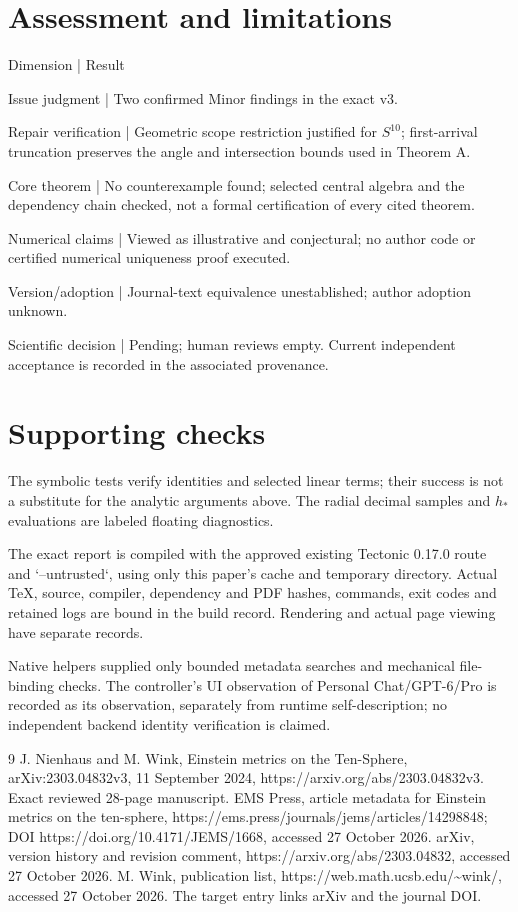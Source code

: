 \documentclass[10pt]{article}
\begin{document}
\section*{Assessment and limitations}
Dimension | Result\par
Issue judgment | Two confirmed Minor findings in the exact v3.\par
Repair verification | Geometric scope restriction justified for \(S^{10}\); first-arrival truncation preserves the angle and intersection bounds used in Theorem A.\par
Core theorem | No counterexample found; selected central algebra and the dependency chain checked, not a formal certification of every cited theorem.\par
Numerical claims | Viewed as illustrative and conjectural; no author code or certified numerical uniqueness proof executed.\par
Version/adoption | Journal-text equivalence unestablished; author adoption unknown.\par
Scientific decision | Pending; human reviews empty. Current independent acceptance is recorded in the associated provenance.\par
\section*{Supporting checks}
The symbolic tests verify identities and selected linear terms; their success is not a substitute for the analytic arguments above. The radial decimal samples and \(h_*\) evaluations are labeled floating diagnostics.\par
The exact report is compiled with the approved existing Tectonic 0.17.0 route and `–untrusted`, using only this paper’s cache and temporary directory. Actual TeX, source, compiler, dependency and PDF hashes, commands, exit codes and retained logs are bound in the build record. Rendering and actual page viewing have separate records.\par
Native helpers supplied only bounded metadata searches and mechanical file-binding checks. The controller’s UI observation of Personal Chat/GPT-6/Pro is recorded as its observation, separately from runtime self-description; no independent backend identity verification is claimed.\par
9 J. Nienhaus and M. Wink, Einstein metrics on the Ten-Sphere, arXiv:2303.04832v3, 11 September 2024, https://arxiv.org/abs/2303.04832v3. Exact reviewed 28-page manuscript. EMS Press, article metadata for Einstein metrics on the ten-sphere, https://ems.press/journals/jems/articles/14298848; DOI https://doi.org/10.4171/JEMS/1668, accessed 27 October 2026. arXiv, version history and revision comment, https://arxiv.org/abs/2303.04832, accessed 27 October 2026. M. Wink, publication list, https://web.math.ucsb.edu/\textasciitilde{}wink/, accessed 27 October 2026. The target entry links arXiv and the journal DOI.\par
\end{document}
